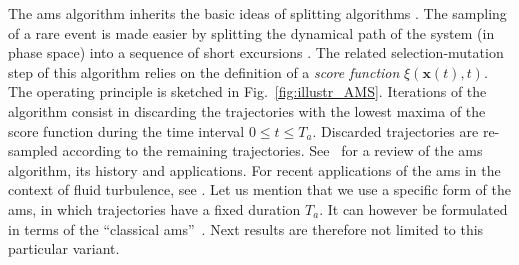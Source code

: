 \documentclass[pre,aps,floatfix,10pt,superscriptaddress, notitlepage,preprint]{revtex4-1}
\begin{document}
%
The \acl{ams} algorithm \cite{cerou_adaptive_2007} inherits the basic ideas of {splitting algorithms} \cite{KahnHarris1951}. The sampling of a rare event is made easier by splitting the dynamical path of the system (in phase space) into 
a sequence of short excursions \cite{glasserman_multilevel_1999,rolland_statistical_2015}.
The related selection-mutation step of this algorithm {relies on the definition of a \textit{score function} $\xi (\mathbf{x}(t),t)$}.
The operating principle is sketched in Fig.~\ref{fig:illustr_AMS}.
%
%
%
%
Iterations of the algorithm consist in discarding the trajectories with the lowest maxima of the score function during the time interval $0\leq t \leq T_a$.
Discarded trajectories are re-sampled according to the remaining trajectories.
See~\cite{cerou2019adaptive} for a review of the \ac{ams} algorithm, its history and applications.
For recent applications of the \ac{ams} in the context of fluid turbulence, see \cite{bouchet2019rare,rolland_extremely_2018}.
{Let us mention that we use a specific form of the \ac{ams}, in which trajectories have a fixed duration $T_a$.
It can however be formulated in terms of the ``classical \ac{ams}''~\cite{lestang_computing_2018}. Next results are therefore not limited to this particular variant.}
\end{document}
